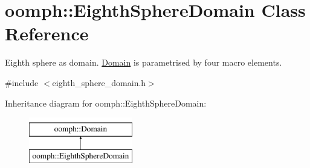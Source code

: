 \hypertarget{classoomph_1_1EighthSphereDomain}{}\section{oomph\+:\+:Eighth\+Sphere\+Domain Class Reference}
\label{classoomph_1_1EighthSphereDomain}


Eighth sphere as domain. \hyperlink{classoomph_1_1Domain}{Domain} is parametrised by four macro elements.  




{\ttfamily \#include $<$eighth\+\_\+sphere\+\_\+domain.\+h$>$}

Inheritance diagram for oomph\+:\+:Eighth\+Sphere\+Domain\+:\begin{figure}[H]
\begin{center}
\leavevmode
\includegraphics[height=2.000000cm]{classoomph_1_1EighthSphereDomain}
\end{center}
\end{figure}
